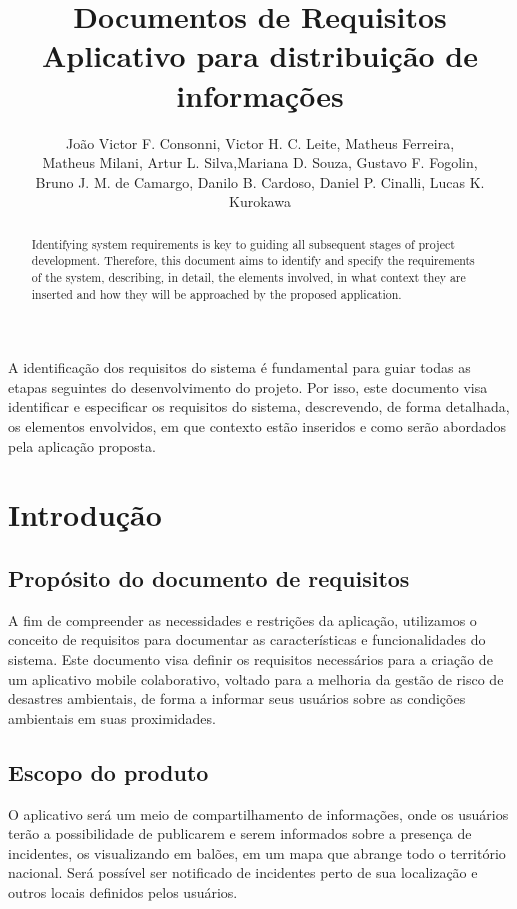 \documentclass[12pt]{article}
\title{Documentos de Requisitos\\ Aplicativo para distribuição de informações}
\author{João Victor F. Consonni\inst{1}, Victor H. C. Leite\inst{1}, Matheus Ferreira\inst{1}, \\Matheus Milani\inst{1}, Artur L. Silva\inst{1},Mariana D. Souza\inst{1}, Gustavo F. Fogolin\inst{1}, \\Bruno J. M. de Camargo\inst{1}, Danilo B. Cardoso\inst{1}, Daniel P. Cinalli\inst{1}, Lucas K. Kurokawa\inst{1}}
\begin{document}
 

\maketitle

\begin{abstract} 
  Identifying system requirements is key to guiding all subsequent stages of project development. Therefore, this document aims to identify and specify the requirements of the system, describing, in detail, the elements involved, in what context they are inserted and how they will be approached by the proposed application.
\end{abstract}

\begin{resumo} 
   A identificação dos requisitos do sistema é fundamental para guiar todas as etapas seguintes do desenvolvimento do projeto. Por isso, este documento visa identificar e especificar os requisitos do sistema, descrevendo, de forma detalhada, os elementos envolvidos, em que contexto estão inseridos e como serão abordados pela aplicação proposta.
\end{resumo}
\section{Introdução}
\subsection{Propósito do documento de requisitos}
A fim de compreender as necessidades e restrições da aplicação, utilizamos o conceito de requisitos para documentar as características e funcionalidades do sistema. Este documento visa definir os requisitos necessários para a criação de um aplicativo mobile colaborativo, voltado para a melhoria da gestão de risco de desastres ambientais, de forma a informar seus usuários sobre as condições ambientais em suas proximidades. 

\subsection{Escopo do produto}
O aplicativo será um meio de compartilhamento de informações, onde os usuários terão a possibilidade de publicarem e serem informados sobre a presença de incidentes, os visualizando em balões, em um mapa que abrange todo o território nacional. Será possível ser notificado de incidentes perto de sua localização e outros locais definidos pelos usuários. 
\end{document}
